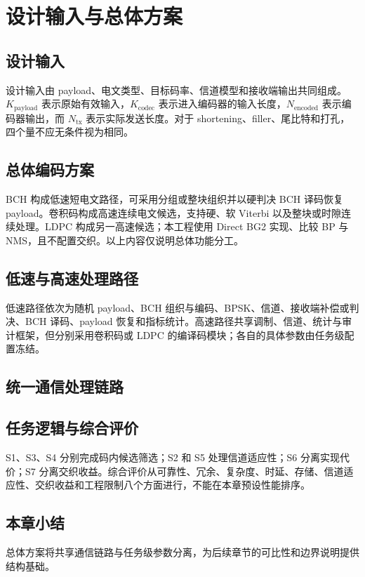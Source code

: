 \chapter{设计输入与总体方案}\label{chap:design}
\section{设计输入}
设计输入由 payload、电文类型、目标码率、信道模型和接收端输出共同组成。$K_{\mathrm{payload}}$ 表示原始有效输入，$K_{\mathrm{codec}}$ 表示进入编码器的输入长度，$N_{\mathrm{encoded}}$ 表示编码器输出，而 $N_{\mathrm{tx}}$ 表示实际发送长度。对于 shortening、filler、尾比特和打孔，四个量不应无条件视为相同。

\section{总体编码方案}
BCH 构成低速短电文路径，可采用分组或整块组织并以硬判决 BCH 译码恢复 payload。卷积码构成高速连续电文候选，支持硬、软 Viterbi 以及整块或时隙连续处理。LDPC 构成另一高速候选；本工程使用 Direct BG2 实现、比较 BP 与 NMS，且不配置交织。以上内容仅说明总体功能分工。

\section{低速与高速处理路径}
低速路径依次为随机 payload、BCH 组织与编码、BPSK、信道、接收端补偿或判决、BCH 译码、payload 恢复和指标统计。高速路径共享调制、信道、统计与审计框架，但分别采用卷积码或 LDPC 的编译码模块；各自的具体参数由任务级配置冻结。

\section{统一通信处理链路}

\section{任务逻辑与综合评价}
S1、S3、S4 分别完成码内候选筛选；S2 和 S5 处理信道适应性；S6 分离实现代价；S7 分离交织收益。综合评价从可靠性、冗余、复杂度、时延、存储、信道适应性、交织收益和工程限制八个方面进行，不能在本章预设性能排序。

\section{本章小结}
总体方案将共享通信链路与任务级参数分离，为后续章节的可比性和边界说明提供结构基础。

